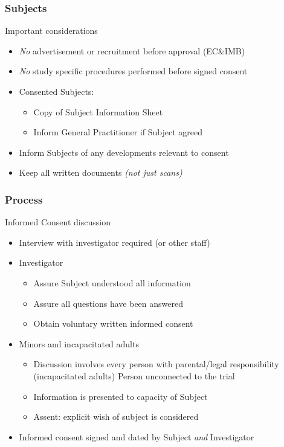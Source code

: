 \documentclass[xcolor=dvipsnames]{beamer}
\begin{document}
\begin{frame}
	\frametitle{Subjects}

	\begin{block}{Important considerations}
	\begin{itemize}
	\item {\em No} advertisement or recruitment before approval (EC\&IMB)
	\item {\em No} study specific procedures performed before signed consent  
	\item Consented Subjects:
	\begin{itemize}
		\item Copy of Subject Information Sheet
		\item Inform General Practitioner if Subject agreed
	\end{itemize}
	\item Inform Subjects of any developments relevant to consent
	\item Keep all written documents {\em (not just scans)}
	\end{itemize}
	\end{block}
	
\end{frame}

\begin{frame}
	\frametitle{Process}

	\begin{block}{Informed Consent discussion}
	\begin{itemize}
	\item Interview with investigator required (or other staff)
	\item Investigator  
	\begin{itemize}
		\item Assure Subject understood all information
		\item Assure all questions have been answered
		\item Obtain voluntary written informed consent
	\end{itemize}
	\item Minors and incapacitated adults
	\begin{itemize}
		\item Discussion involves every person with parental/legal responsibility\\
			(incapacitated adults) Person unconnected to the trial
		\item Information is presented to capacity of Subject
		\item Assent: explicit wish of subject is considered
	\end{itemize}
	\item Informed consent {\color{Maroon}signed} and {\color{Maroon}dated} by Subject {\color{Maroon}\em and} Investigator
	\end{itemize}
	\end{block}
	
\end{frame}
\end{document}

